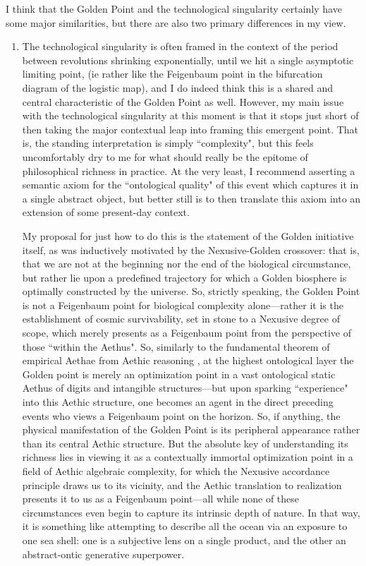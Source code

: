 I think that the Golden Point and the technological singularity \cite{} certainly have some major similarities, but there are also two primary differences in my view.
\begin{enumerate}
    \item The technological singularity is often framed in the context of the period between revolutions shrinking exponentially, until we hit a single asymptotic limiting point, (ie rather like the Feigenbaum point in the bifurcation diagram of the logistic map), and I do indeed think this is a shared and central characteristic of the Golden Point as well. However, my main issue with the technological singularity at this moment is that it stops just short of then taking the major contextual leap into framing this emergent point. That is, the standing interpretation is simply ``complexity", but this feels uncomfortably dry to me for what should really be the epitome of philosophical richness in practice. At the very least, I recommend asserting a semantic axiom for the ``ontological quality" of this event which captures it in a single abstract object, but better still is to then translate this axiom into an extension of some present-day context. 
    
    My proposal for just how to do this is the statement of the Golden initiative itself, as was inductively motivated by the Nexusive-Golden crossover: that is, that we are not at the beginning nor the end of the biological circumstance, but rather lie upon a predefined trajectory for which a Golden biosphere is optimally constructed by the universe. So, strictly speaking, the Golden Point is not a Feigenbaum point for biological complexity alone---rather it is the establishment of cosmic survivability, set in stone to a Nexusive degree of scope, which merely presents as a Feigenbaum point from the perspective of those ``within the Aethus". So, similarly to the fundamental theorem of empirical Aethae from Aethic reasoning \cite{Aethus}, at the highest ontological layer the Golden point is merely an optimization point in a vast ontological static Aethus of digits and intangible structures---but upon sparking ``experience" into this Aethic structure, one becomes an agent in the direct preceding events who views a Feigenbaum point on the horizon. So, if anything, the physical manifestation of the Golden Point is its peripheral appearance rather than its central Aethic structure. But the absolute key of understanding its richness lies in viewing it as a contextually immortal optimization point in a field of Aethic algebraic complexity, for which the Nexusive accordance principle draws us to its vicinity, and the Aethic translation to realization presents it to us as a Feigenbaum point---all while none of these circumstances even begin to capture its intrinsic depth of nature. In that way, it is something like attempting to describe all the ocean via an exposure to one sea shell: one is a subjective lens on a single product, and the other an abstract-ontic generative superpower. 


\end{enumerate}
